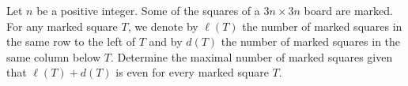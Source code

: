 Let $n$ be a positive integer.
Some of the squares of a $3n \times 3n$ board are marked.
For any marked square $T$, we denote by $\ell(T)$ the number of marked squares
in the same row to the left of $T$ and by $d(T)$ the number of marked squares in the same column below $T$.
Determine the maximal number of marked squares given that $\ell(T)+d(T)$ is even for every marked square $T$.
